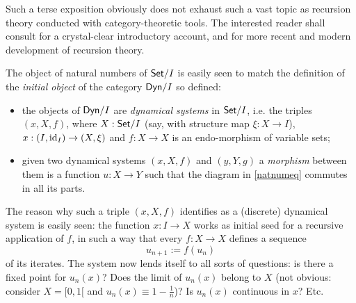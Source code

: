 Such a terse exposition obviously does not exhaust such a vast topic as recursion theory conducted with category-theoretic tools. The interested reader shall consult \cite{jacobs1997tutorial} for a crystal-clear introductory account, and \cite{cockett2008introduction,cockett2014total} for more recent and modern development of recursion theory.

The object of natural numbers of $\mathsf{Set}/I$ is easily seen to match the definition of the \emph{initial object} \cite[]{Bor1} of the category $\mathsf{Dyn}/I$ so defined:
\begin{itemize}
	\item the objects of $\mathsf{Dyn}/I$ are \emph{dynamical systems} in $\mathsf{Set}/I$, i.e. the triples $(x,X,f)$, where $X : \mathsf{Set}/I$ (say, with structure map $\xi : X \to I$), $x : (I,\text{id}_I) \to (X,\xi)$ and $f : X \to X$ is an endo-morphism of variable sets;
	\item given two dynamical systems $(x,X,f)$ and $(y,Y,g)$ a \emph{morphism} between them is a function $u  :X \to Y$ such that the diagram
	      in \eqref{natnumeq} commutes in all its parts.
\end{itemize}
The reason why such a triple $(x,X,f)$ identifies as a (discrete) dynamical system is easily seen: the function $x : I \to X$ works as initial seed for a recursive application of $f$, in such a way that every $f : X \to X$ defines a sequence
\[u_{n+1} := f(u_n)\]
of its iterates. The system now lends itself to all sorts of questions: is there a fixed point for \(u_n(x)\)? Does the limit of \(u_n(x)\) belong to \(X\) (not obvious: consider \(X=[0,1[\) and \(u_n(x)\equiv 1-\frac{1}{n}\))? Is \(u_n(x)\) continuous in \(x\)? Etc.